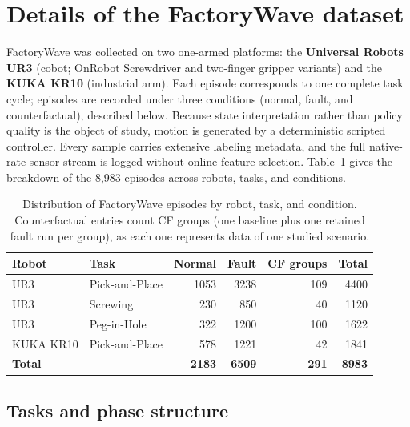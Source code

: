 \section{Details of the FactoryWave dataset}
\label{app:data_recording}

FactoryWave was collected on two one-armed platforms: the \textbf{Universal Robots UR3} (cobot; OnRobot Screwdriver and two-finger gripper variants) and the \textbf{KUKA KR10} (industrial arm). Each episode corresponds to one complete task cycle; episodes are recorded under three conditions (normal, fault, and counterfactual), described below. Because state interpretation rather than policy quality is the object of study, motion is generated by a deterministic scripted controller. Every sample carries extensive labeling metadata, and the full native-rate sensor stream is logged without online feature selection. Table~\ref{tab:factorywave_distribution} gives the breakdown of the 8{,}983 episodes across robots, tasks, and conditions.

\begin{table}[htbp]
    \centering
    \caption{Distribution of FactoryWave episodes by robot, task, and condition. Counterfactual entries count CF groups (one baseline plus one retained fault run per group), as each one represents data of one studied scenario.}
    \label{tab:factorywave_distribution}
    \small
    \begin{tabular}{@{}llrrrr@{}}
        \toprule
        Robot          & Task           & Normal        & Fault         & CF groups    & Total         \\
        \midrule
        UR3            & Pick-and-Place & 1053          & 3238          & 109          & 4400          \\
        UR3            & Screwing       & 230           & 850           & 40           & 1120          \\
        UR3            & Peg-in-Hole    & 322           & 1200          & 100          & 1622          \\
        KUKA KR10      & Pick-and-Place & 578           & 1221          & 42           & 1841          \\
        \midrule
        \textbf{Total} &                & \textbf{2183} & \textbf{6509} & \textbf{291} & \textbf{8983} \\
        \bottomrule
    \end{tabular}
\end{table}

\subsection{Tasks and phase structure}

